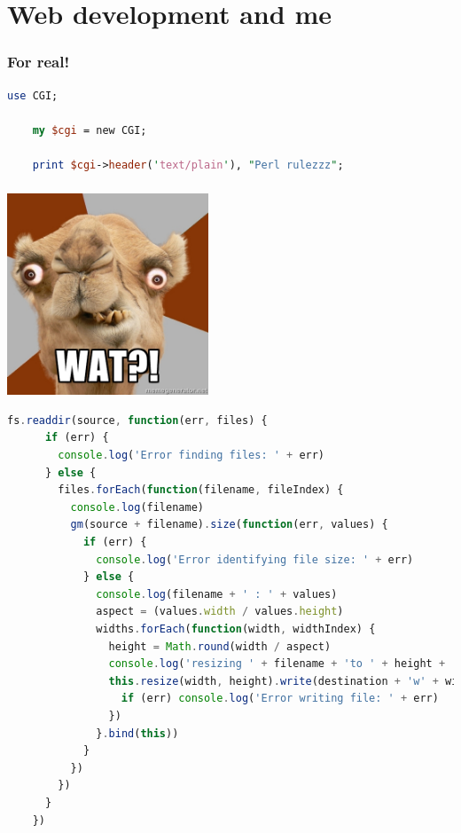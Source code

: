 \section{Web development and me}
\begin{frame}
\end{frame}
\begin{frame}[fragile]
  \frametitle{For real!}
  \begin{center}
    \begin{lstlisting}[language=Perl]
    use CGI;

    my $cgi = new CGI;

    print $cgi->header('text/plain'), "Perl rulezzz";
    \end{lstlisting}
  \end{center}
\end{frame}
\begin{frame}
  \frametitle{}
  \begin{center}
    \includegraphics[width=6cm]{images/perlwat}
  \end{center}
\end{frame}
\begin{frame}
\end{frame}
\begin{frame}[fragile]
  \begin{center}
    \begin{lstlisting}[language=Javascript,basicstyle=\tiny\ttfamily\bfseries]
    fs.readdir(source, function(err, files) {
      if (err) {
        console.log('Error finding files: ' + err)
      } else {
        files.forEach(function(filename, fileIndex) {
          console.log(filename)
          gm(source + filename).size(function(err, values) {
            if (err) {
              console.log('Error identifying file size: ' + err)
            } else {
              console.log(filename + ' : ' + values)
              aspect = (values.width / values.height)
              widths.forEach(function(width, widthIndex) {
                height = Math.round(width / aspect)
                console.log('resizing ' + filename + 'to ' + height + 'x' + height)
                this.resize(width, height).write(destination + 'w' + width + '_' + filename, function(err) {
                  if (err) console.log('Error writing file: ' + err)
                })
              }.bind(this))
            }
          })
        })
      }
    })
    \end{lstlisting}
  \end{center}
\end{frame}
